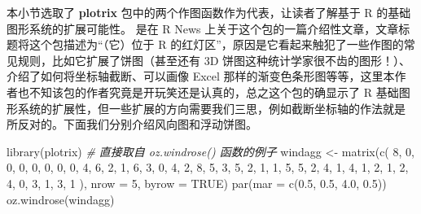 \documentclass[
  b5paper,
  UTF8,twoside]{book}
\newenvironment{Shaded}{\begin{snugshade}}{\end{snugshade}}
\newcommand{\AttributeTok}[1]{\textcolor[rgb]{0.77,0.63,0.00}{#1}}
\newcommand{\CommentTok}[1]{\textcolor[rgb]{0.56,0.35,0.01}{\textit{#1}}}
\newcommand{\ConstantTok}[1]{\textcolor[rgb]{0.00,0.00,0.00}{#1}}
\newcommand{\DecValTok}[1]{\textcolor[rgb]{0.00,0.00,0.81}{#1}}
\newcommand{\FloatTok}[1]{\textcolor[rgb]{0.00,0.00,0.81}{#1}}
\newcommand{\FunctionTok}[1]{\textcolor[rgb]{0.00,0.00,0.00}{#1}}
\newcommand{\NormalTok}[1]{#1}
\newcommand{\OtherTok}[1]{\textcolor[rgb]{0.56,0.35,0.01}{#1}}
\begin{document}
本小节选取了 \textbf{plotrix} 包中的两个作图函数作为代表，让读者了解基于 R 的基础图形系统的扩展可能性。\citet{Lemon06} 是在 R
News 上关于这个包的一篇介绍性文章，文章标题将这个包描述为``（它）位于 R 的红灯区''，原因是它看起来触犯了一些作图的常见规则，比如它扩展了饼图（甚至还有 3D 饼图这种统计学家很不齿的图形！）、介绍了如何将坐标轴截断、可以画像 Excel 那样的渐变色条形图等等，这里本作者也不知该包的作者究竟是开玩笑还是认真的，总之这个包的确显示了 R 基础图形系统的扩展性，但一些扩展的方向需要我们三思，例如截断坐标轴的作法就是 \citet{Cleveland85} 所反对的。下面我们分别介绍风向图和浮动饼图。





\begin{Shaded}
\begin{Highlighting}[]
\FunctionTok{library}\NormalTok{(plotrix) }\CommentTok{\# 直接取自 oz.windrose() 函数的例子}
\NormalTok{windagg }\OtherTok{\textless{}{-}} \FunctionTok{matrix}\NormalTok{(}\FunctionTok{c}\NormalTok{(}
  \DecValTok{8}\NormalTok{, }\DecValTok{0}\NormalTok{, }\DecValTok{0}\NormalTok{, }\DecValTok{0}\NormalTok{, }\DecValTok{0}\NormalTok{, }\DecValTok{0}\NormalTok{, }\DecValTok{0}\NormalTok{, }
  \DecValTok{0}\NormalTok{, }\DecValTok{4}\NormalTok{, }\DecValTok{6}\NormalTok{, }\DecValTok{2}\NormalTok{, }\DecValTok{1}\NormalTok{, }\DecValTok{6}\NormalTok{, }\DecValTok{3}\NormalTok{, }
  \DecValTok{0}\NormalTok{, }\DecValTok{4}\NormalTok{, }\DecValTok{2}\NormalTok{, }\DecValTok{8}\NormalTok{, }\DecValTok{5}\NormalTok{, }\DecValTok{3}\NormalTok{, }\DecValTok{5}\NormalTok{, }
  \DecValTok{2}\NormalTok{, }\DecValTok{1}\NormalTok{, }\DecValTok{1}\NormalTok{, }\DecValTok{5}\NormalTok{, }\DecValTok{5}\NormalTok{, }\DecValTok{2}\NormalTok{, }\DecValTok{4}\NormalTok{, }
  \DecValTok{1}\NormalTok{, }\DecValTok{4}\NormalTok{, }\DecValTok{1}\NormalTok{, }\DecValTok{2}\NormalTok{, }\DecValTok{1}\NormalTok{, }\DecValTok{2}\NormalTok{, }\DecValTok{4}\NormalTok{, }
  \DecValTok{0}\NormalTok{, }\DecValTok{3}\NormalTok{, }\DecValTok{1}\NormalTok{, }\DecValTok{3}\NormalTok{, }\DecValTok{1}
\NormalTok{), }\AttributeTok{nrow =} \DecValTok{5}\NormalTok{, }\AttributeTok{byrow =} \ConstantTok{TRUE}\NormalTok{)}
\FunctionTok{par}\NormalTok{(}\AttributeTok{mar =} \FunctionTok{c}\NormalTok{(}\FloatTok{0.5}\NormalTok{, }\FloatTok{0.5}\NormalTok{, }\FloatTok{4.0}\NormalTok{, }\FloatTok{0.5}\NormalTok{))}
\FunctionTok{oz.windrose}\NormalTok{(windagg)}
\end{Highlighting}
\end{Shaded}
\end{document}
